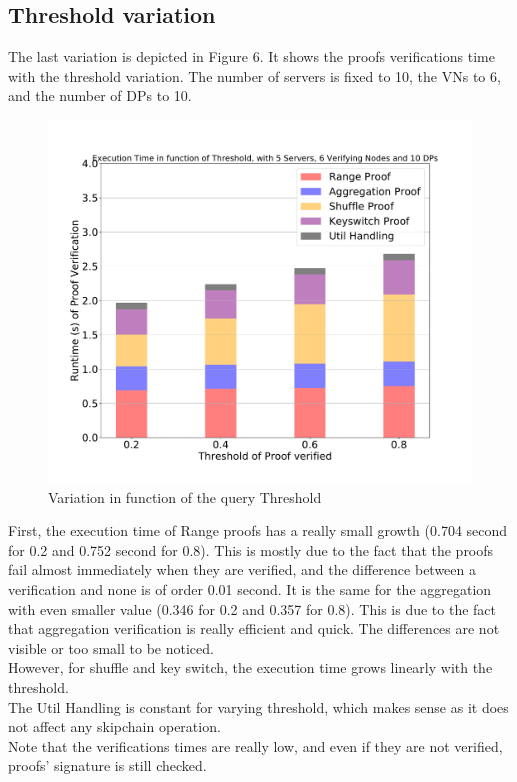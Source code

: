 \documentclass{article}
\begin{document}
\subsection{Threshold variation}
The last variation is depicted in Figure 6. It shows the proofs verifications time with the threshold variation. The number of servers is fixed to 10, the VNs to 6, and the number of DPs to 10.\\

\begin{figure}[H]
\includegraphics[scale=0.5]{variationWithThreshold}
\caption{Variation in function of the query Threshold}
\end{figure}

First, the execution time of Range proofs has a really small growth (0.704 second for 0.2 and 0.752 second for 0.8). This is mostly due to the fact that the proofs fail almost immediately when they are verified, and the difference between a verification and none is of order 0.01 second. It is the same for the aggregation with even smaller value (0.346 for 0.2 and 0.357 for 0.8). This is due to the fact that aggregation verification is really efficient and quick. The differences are not visible or too small to be noticed.\\
However, for shuffle and key switch, the execution time grows linearly with the threshold.\\
The Util Handling is constant for varying threshold, which makes sense as it does not affect any skipchain operation.\\
Note that the verifications times are really low, and even if they are not verified, proofs' signature is still checked.
\end{document}
